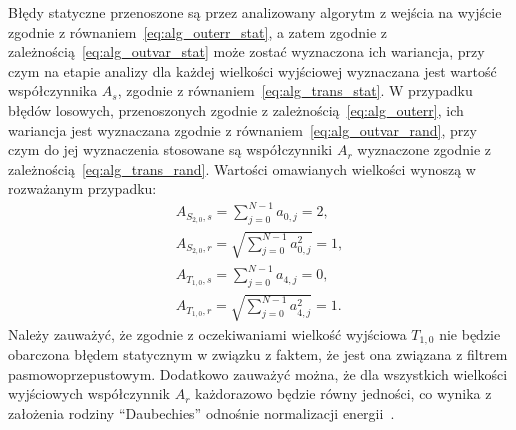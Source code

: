 Błędy statyczne przenoszone są przez analizowany algorytm z wejścia na wyjście zgodnie z równaniem~\eqref{eq:alg_outerr_stat}, a zatem zgodnie z zależnością~\eqref{eq:alg_outvar_stat} może zostać wyznaczona ich wariancja, przy czym na etapie analizy dla każdej wielkości wyjściowej wyznaczana jest wartość współczynnika $A_{s}$, zgodnie z równaniem~\eqref{eq:alg_trans_stat}. W przypadku błędów losowych, przenoszonych zgodnie z zależnością~\eqref{eq:alg_outerr}, ich wariancja jest wyznaczana zgodnie z równaniem~\eqref{eq:alg_outvar_rand}, przy czym do jej wyznaczenia stosowane są współczynniki $A_{r}$ wyznaczone zgodnie z zależnością~\eqref{eq:alg_trans_rand}. Wartości omawianych wielkości wynoszą w rozważanym przypadku:
\begin{gather}
A_{S_{2,0},s} = \sum _{j = 0} ^{N-1} a_{0, j} = 2 \label{eq:sym_partd_output_as_S_2_0}, \\
A_{S_{2,0},r} = \sqrt{\sum _{j = 0} ^{N-1} a_{0, j}^{2}} = 1 \label{eq:sym_partd_output_ar_S_2_0}, \\
A_{T_{1,0},s} = \sum _{j = 0} ^{N-1} a_{4, j} = 0 \label{eq:sym_partd_output_as_T_1_0}, \\
A_{T_{1,0},r} = \sqrt{\sum _{j = 0} ^{N-1} a_{4, j}^{2}} = 1 \label{eq:sym_partd_output_ar_T_1_0}.
\end{gather}
Należy zauważyć, że zgodnie z oczekiwaniami wielkość wyjściowa $T_{1,0}$ nie będzie obarczona błędem statycznym w związku z faktem, że jest ona związana z filtrem pasmowoprzepustowym. Dodatkowo zauważyć można, że dla wszystkich wielkości wyjściowych współczynnik $A_{r}$ każdorazowo będzie równy jedności, co wynika z założenia rodziny \enquote{Daubechies} odnośnie normalizacji energii~\cite{vonesch_dbbasics, wei_coiflet}.


